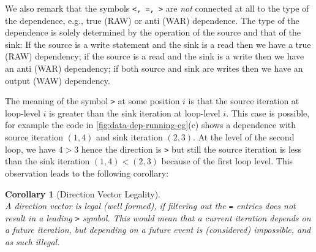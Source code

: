 \documentclass[acmsmall,review]{acmart}\settopmatter{printfolios=true,printccs=false,printacmref=false}
\newtheorem{mycorol}{Corollary}
\begin{document}
We also remark that the symbols {\tt <, =, >} are \emph{not} connected at
all to the type of the dependence, e.g., true (RAW) or anti (WAR) dependence. 
The type of the dependence is solely determined by the operation of the
source and that of the sink: If the source is a write statement and the 
sink is a read then we have a true (RAW) dependency; if the source is a 
read and the sink is a write then we have an anti (WAR) dependency;
if both source and sink are writes then we have an output (WAW) dependency.  

The meaning of the symbol {\tt>} at some position $i$ is that
the source iteration at loop-level $i$ is greater than the sink
iteration at loop-level $i$. This case is possible, for example
the code in \cref{fig:data-dep-running-eg}(c) shows a dependence
with source iteration $(1,4)$ and sink iteration $(2,3)$. At the
level of the second loop, we have $4 > 3$ hence the direction
is {\tt >} but still the source iteration is less than the sink
iteration $(1,4) < (2,3)$ because of the first loop level.
This observation leads to the following corollary:

\begin{mycorol}[Direction Vector Legality]\label{Leg-Dir-Vect}
$\mbox{ }$\\
A direction vector is legal (well formed), if filtering out 
the {\tt =} entries does \emph{not} result in a leading {\tt>}
symbol. This would mean that a current iteration depends on
a future iteration, but depending on a future event is (considered)
impossible, and as such illegal.
\end{mycorol}
\end{document}
